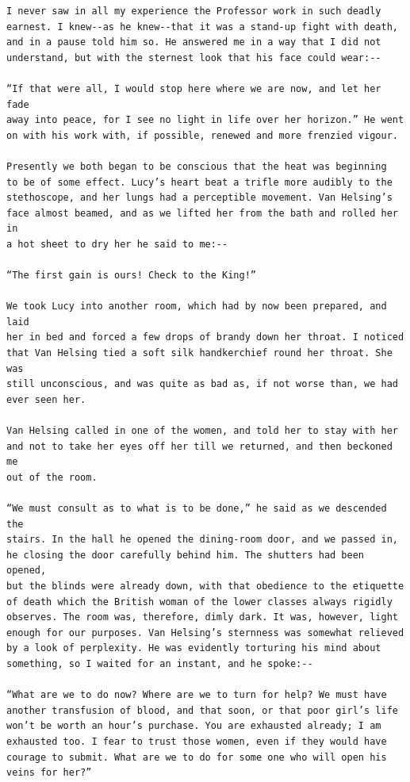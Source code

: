 \documentclass{article}
\begin{document}
\begin{verbatim}
I never saw in all my experience the Professor work in such deadly
earnest. I knew--as he knew--that it was a stand-up fight with death,
and in a pause told him so. He answered me in a way that I did not
understand, but with the sternest look that his face could wear:--

“If that were all, I would stop here where we are now, and let her fade
away into peace, for I see no light in life over her horizon.” He went
on with his work with, if possible, renewed and more frenzied vigour.

Presently we both began to be conscious that the heat was beginning
to be of some effect. Lucy’s heart beat a trifle more audibly to the
stethoscope, and her lungs had a perceptible movement. Van Helsing’s
face almost beamed, and as we lifted her from the bath and rolled her in
a hot sheet to dry her he said to me:--

“The first gain is ours! Check to the King!”

We took Lucy into another room, which had by now been prepared, and laid
her in bed and forced a few drops of brandy down her throat. I noticed
that Van Helsing tied a soft silk handkerchief round her throat. She was
still unconscious, and was quite as bad as, if not worse than, we had
ever seen her.

Van Helsing called in one of the women, and told her to stay with her
and not to take her eyes off her till we returned, and then beckoned me
out of the room.

“We must consult as to what is to be done,” he said as we descended the
stairs. In the hall he opened the dining-room door, and we passed in,
he closing the door carefully behind him. The shutters had been opened,
but the blinds were already down, with that obedience to the etiquette
of death which the British woman of the lower classes always rigidly
observes. The room was, therefore, dimly dark. It was, however, light
enough for our purposes. Van Helsing’s sternness was somewhat relieved
by a look of perplexity. He was evidently torturing his mind about
something, so I waited for an instant, and he spoke:--

“What are we to do now? Where are we to turn for help? We must have
another transfusion of blood, and that soon, or that poor girl’s life
won’t be worth an hour’s purchase. You are exhausted already; I am
exhausted too. I fear to trust those women, even if they would have
courage to submit. What are we to do for some one who will open his
veins for her?”


\end{verbatim}
\end{document}
